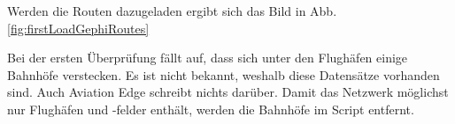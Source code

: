 \begin{figure}[h]
    \centering
\end{figure}

Werden die Routen dazugeladen ergibt sich das Bild in Abb. \ref{fig:firstLoadGephiRoutes}

Bei der ersten Überprüfung fällt auf, dass sich unter den Flughäfen einige Bahnhöfe verstecken.
Es ist nicht bekannt, weshalb diese Datensätze vorhanden sind.
Auch Aviation Edge schreibt nichts darüber.
Damit das Netzwerk möglichst nur Flughäfen und -felder enthält, werden die Bahnhöfe im Script entfernt.


